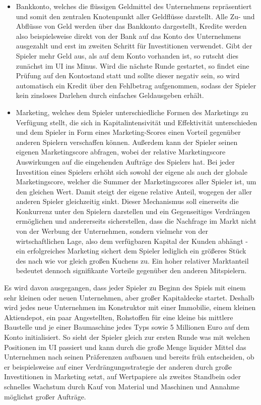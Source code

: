 \begin{itemize}
\item Bankkonto, welches die flüssigen Geldmittel des Unternehmens repräsentiert und somit den zentralen Knotenpunkt aller Geldflüsse darstellt. Alle Zu- und Abflüsse von Geld werden über das Bankkonto dargestellt, Kredite werden also beispielsweise direkt von der Bank auf das Konto des Unternehmens ausgezahlt und erst im zweiten Schritt für Investitionen verwendet. Gibt der Spieler mehr Geld aus, als auf dem Konto vorhanden ist, so rutscht dies zunächst im UI ins Minus. Wird die nächste Runde gestartet, so findet eine Prüfung auf den Kontostand statt und sollte dieser negativ sein, so wird automatisch ein Kredit über den Fehlbetrag aufgenommen, sodass der Spieler kein zinsloses Darlehen durch einfaches Geldausgeben erhält.

\item Marketing, welches dem Spieler unterschiedliche Formen des Marketings zu Verfügung stellt, die sich in Kapitalintensivität und Effektivität unterschieden und dem Spieler in Form eines Marketing-Scores einen Vorteil gegenüber anderen Spielern verschaffen können. Außerdem kann der Spieler seinen eigenen Marketingscore abfragen, wobei der relative Marketingscore Auswirkungen auf die eingehenden Aufträge des Spielers hat. Bei jeder Investition eines Spielers erhöht sich sowohl der eigene als auch der globale Marketingscore, welcher die Summer der Marketingscores aller Spieler ist, um den gleichen Wert. Damit steigt der eigene relative Anteil, wogegen der aller anderen Spieler gleichzeitig sinkt. Dieser Mechanismus soll einerseits die Konkurrenz unter den Spielern darstellen und ein Gegenseitiges Verdrängen ermöglichen und andererseits sicherstellen, dass die Nachfrage im Markt nicht von der Werbung der Unternehmen, sondern vielmehr von der wirtschaftlichen Lage, also dem verfügbaren Kapital der Kunden abhängt - ein erfolgreiches Marketing sichert dem Spieler lediglich ein größeres Stück des nach wie vor gleich großen Kuchens zu. Ein hoher relativer Marktanteil bedeutet dennoch signifikante Vorteile gegenüber den anderen Mitspielern.

\end{itemize}

Es wird davon ausgegangen, dass jeder Spieler zu Beginn des Spiels mit einem sehr kleinen oder neuen Unternehmen, aber großer Kapitaldecke startet. Deshalb wird jedes neue Unternehmen im Konstruktor mit einer Immobilie, einem kleinen Aktiendepot, ein paar Angestellten, Rohstoffen für eine kleine bis mittlere Baustelle und je einer Baumaschine jedes Typs sowie 5 Millionen Euro auf dem Konto initialisiert. So sieht der Spieler gleich zur ersten Runde was mit welchen Positionen im UI passiert und kann durch die große Menge liquider Mittel das Unternehmen nach seinen Präferenzen aufbauen und bereits früh entscheiden, ob er beispielsweise auf einer Verdrängungsstrategie der anderen durch große Investitionen in Marketing setzt, auf Wertpapiere als zweites Standbein oder schnelles Wachstum durch Kauf von Material und Maschinen und Annahme möglichst großer Aufträge.


